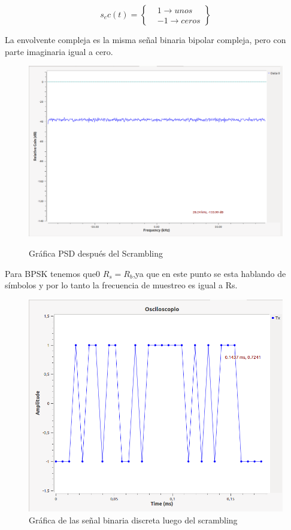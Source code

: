 \begin{itemize}
\begin{equation} \label{capcuatro_sesentayocho}
s_ec(t)=\begin{Bmatrix}
 & 1 \rightarrow  unos \\ 
 & -1\rightarrow ceros
\end{Bmatrix}
\end{equation}

La envolvente compleja es la misma señal binaria bipolar compleja, pero con parte imaginaria igual a cero.


\begin{figure}[h!]
	\captionsetup{justification = raggedright, singlelinecheck = false}
	\caption{Gráfica PSD después del Scrambling} 
	\centering
	\includegraphics[scale=0.4]{Imagenes/capa5.png}
	\label{fig:ej1_psd_scram}
\end{figure}

Para BPSK tenemos que0 $R_{s}=R_{b}$,ya que en este punto se esta hablando de símbolos y por lo tanto la frecuencia de muestreo es igual a Rs. \\

\begin{figure}[h!]
	\captionsetup{justification = raggedright, singlelinecheck = false}
	\caption{Gráfica de las señal binaria discreta luego del scrambling}
	\label{fig:ej1_scram_t}
   \includegraphics[width=0.8\linewidth]{Imagenes/tiempocapa5.png}
   \centering
\end{figure}


\end{itemize}
